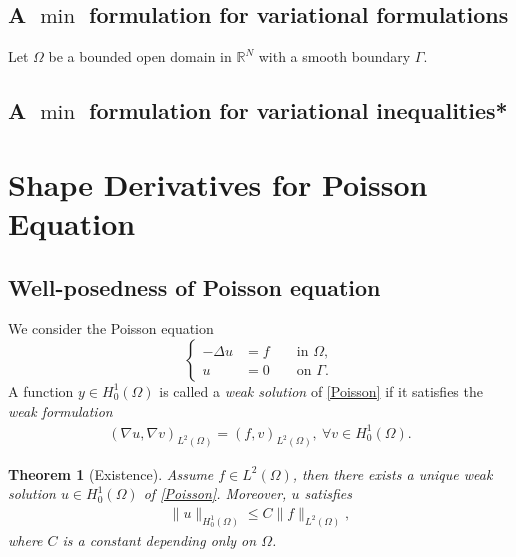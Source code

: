 \documentclass[oneside,11pt]{book}
\numberwithin{equation}{section}
\newtheorem{theorem}{Theorem}[section]
\begin{document}
\subsection{A $\min$ formulation for variational formulations}
Let $\Omega$ be a bounded open domain in $\mathbb{R}^N$ with a smooth boundary $\Gamma$.

\subsection{A $\min$ formulation for variational inequalities*}

\section{Shape Derivatives for Poisson Equation}

\subsection{Well-posedness of Poisson equation}
We consider the Poisson equation
\begin{equation}
    \label{Poisson}
    \left\{\begin{split}
        -\Delta u &= f &&\mbox{ in } \Omega,\\
        u &= 0 &&\mbox{ on } \Gamma.
    \end{split}\right.
\end{equation}
A function $y\in H_0^1(\Omega)$ is called a \emph{weak solution} of \eqref{Poisson} if it satisfies the \emph{weak formulation}
\begin{align}
    \label{variational formulation}
    (\nabla u,\nabla v)_{L^2(\Omega)} = (f,v)_{L^2(\Omega)},\ \forall v\in H_0^1(\Omega).
\end{align}

\begin{theorem}[Existence]
    \label{theorem existence}
    Assume $f\in L^2(\Omega)$, then there exists a unique weak solution $u\in H_0^1(\Omega)$ of \eqref{Poisson}. Moreover, $u$ satisfies
    \begin{align}
        \|u\|_{H_0^1(\Omega)}\le C\|f\|_{L^2(\Omega)},
    \end{align}
    where $C$ is a constant depending only on $\Omega$.
\end{theorem}
\end{document}
